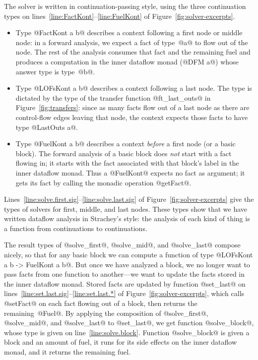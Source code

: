 \documentclass[blockstyle,preprint,natbib,nocopyrightspace]{sigplanconf}
\newcommand\lineref[1]{line~\ref{line:#1}}
\newcommand\linerangeref[2]{\mbox{lines~\ref{line:#1}--\ref{line:#2}}}
\newcommand\Linerangeref[2]{\mbox{Lines~\ref{line:#1}--\ref{line:#2}}}
\newcommand\figref[1]{Figure~\ref{fig:#1}}
\begin{document}
The solver is written in continuation-passing style, using the three
continuation types on \linerangeref{FactKont}{FuelKont} of
\figref{solver-excerpts}. 
\begin{itemize}
\item
Type @FactKont a b@ describes a context following a first node or middle
node: in a forward analysis, we expect a fact of type~@a@
to flow out of the node.
The rest of the analysis consumes that
fact and the remaining fuel and produces a computation in the inner
dataflow monad (@DFM a@) whose answer type is type~@b@.
\item
Type @LOFsKont a b@ describes a context following a last node.
The type is dictated by the type of the transfer function
@ft_last_outs@ in \figref{transfers}:
since as many facts flow out of a last node as there are control-flow
edges leaving that node, the context expects those facts to have type
@LastOuts a@.
\item
Type @FuelKont a b@ describes a context \emph{before} a first node (or a
basic block).
The forward analysis of a basic block does \emph{not} start with a
fact flowing in; it starts with the fact associated with that block's
label in the inner dataflow monad.
Thus a @FuelKont@ expects no fact as argument; it gets its fact by
calling the monadic operation @getFact@.
\end{itemize}
\Linerangeref{solve.first.sig}{solve.last.sig} of
\figref{solver-excerpts} give the types of
solvers for first, middle, and last nodes.
These types show that we have written dataflow analysis in Strachey's
style:
the analysis of each kind of thing is a function from continuations to
continuations. 

The result types of @solve_first@, @solve_mid@, and @solve_last@
compose nicely, so that for any basic block we can compute a function
of type
@LOFsKont a b -> FuelKont a b@.
But once we have analyzed a block, we no longer want to pass facts
from one function to another---we want to update the facts stored in
the inner dataflow monad.
Stored facts are updated by function @set_last@ on
\linerangeref{set.last.sig}{set.last.*} of 
\figref{solver-excerpts}, which calls @setFact@ on each fact
flowing out of a block, then returns the remaining~@Fuel@.
By applying the composition
of @solve_first@, @solve_mid@, and @solve_last@ to @set_last@, we get
function @solve_block@, whose type is given on \lineref{solve.block}.
Function @solve_block@ is given a block and an amount of
fuel,
it runs for its side effects on the inner dataflow monad,
and
it returns the remaining fuel.
\end{document}
